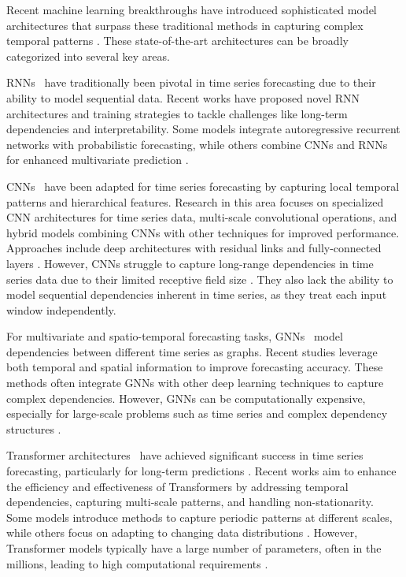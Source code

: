 \documentclass{ieeetmlcn}
\begin{document}
Recent machine learning breakthroughs have introduced sophisticated model architectures that surpass these traditional methods in capturing complex temporal patterns \cite{acmtimeseriesreview2024}. These state-of-the-art architectures can be broadly categorized into several key areas.

RNNs~\cite{lai2018modelinglongshorttermtemporal, Jhin_2024, li2023learningpolarrepresentationextremeadaptive} have traditionally been pivotal in time series forecasting due to their ability to model sequential data. Recent works have proposed novel RNN architectures and training strategies to tackle challenges like long-term dependencies and interpretability. Some models integrate autoregressive recurrent networks with probabilistic forecasting, while others combine CNNs and RNNs for enhanced multivariate prediction \cite{li2024evogwp}.

CNNs~\cite{wang2023micn} have been adapted for time series forecasting by capturing local temporal patterns and hierarchical features. Research in this area focuses on specialized CNN architectures for time series data, multi-scale convolutional operations, and hybrid models combining CNNs with other techniques for improved performance. Approaches include deep architectures with residual links and fully-connected layers \cite{donghao2024moderntcn}. However, CNNs struggle to capture long-range dependencies in time series data due to their limited receptive field size \cite{wu2023timesnettemporal2dvariationmodeling}. They also lack the ability to model sequential dependencies inherent in time series, as they treat each input window independently.

For multivariate and spatio-temporal forecasting tasks, GNNs~\cite{yi2024fouriergnn, zhang2024irregular} model dependencies between different time series as graphs. Recent studies leverage both temporal and spatial information to improve forecasting accuracy. These methods often integrate GNNs with other deep learning techniques to capture complex dependencies. However, GNNs can be computationally expensive, especially for large-scale problems such as time series and complex dependency structures \cite{jin2024survey}.

Transformer architectures~\cite{wu2023timesnettemporal2dvariationmodeling} have achieved significant success in time series forecasting, particularly for long-term predictions \cite{vaswani2017attention}. Recent works aim to enhance the efficiency and effectiveness of Transformers by addressing temporal dependencies, capturing multi-scale patterns, and handling non-stationarity. Some models introduce methods to capture periodic patterns at different scales, while others focus on adapting to changing data distributions \cite{jia2024witran}. However, Transformer models typically have a large number of parameters, often in the millions, leading to high computational requirements \cite{liu2023nonstationary}.
\end{document}
